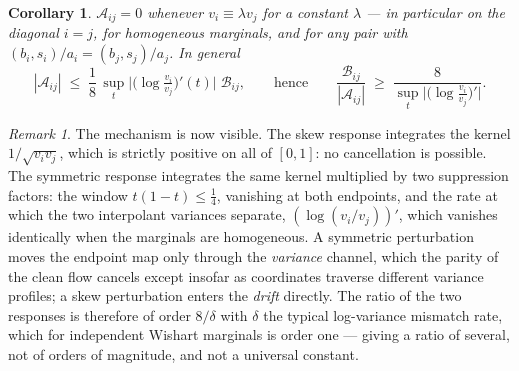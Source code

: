 \documentclass[11pt]{article}
\newtheorem{corollary}{Corollary}
\theoremstyle{remark}
\newtheorem{remark}{Remark}
\begin{document}
\begin{corollary}\label{cor:supp}
$\mathcal A_{ij}=0$ whenever $v_i\equiv\lambda v_j$ for a constant $\lambda$ --- in particular on
the diagonal $i=j$, for homogeneous marginals, and for any pair with
$(b_i,s_i)/a_i=(b_j,s_j)/a_j$. In general
\[
|\mathcal A_{ij}|\;\le\;\frac18\,\sup_{t}\big|\big(\log\tfrac{v_i}{v_j}\big)'(t)\big|\;
\mathcal B_{ij},
\qquad\text{hence}\qquad
\frac{\mathcal B_{ij}}{|\mathcal A_{ij}|}\;\ge\;
\frac{8}{\sup_t\big|\big(\log\tfrac{v_i}{v_j}\big)'\big|}.
\]
\end{corollary}

\begin{remark}\label{rem:mech}
The mechanism is now visible. The skew response integrates the kernel $1/\sqrt{v_iv_j}$, which is
strictly positive on all of $[0,1]$: no cancellation is possible. The symmetric response
integrates the same kernel multiplied by two suppression factors: the window $t(1-t)\le\tfrac14$,
vanishing at both endpoints, and the rate at which the two interpolant variances separate,
$(\log(v_i/v_j))'$, which vanishes identically when the marginals are homogeneous. A symmetric
perturbation moves the endpoint map only through the \emph{variance} channel, which the parity of
the clean flow cancels except insofar as coordinates traverse different variance profiles; a skew
perturbation enters the \emph{drift} directly. The ratio of the two responses is therefore of
order $8/\delta$ with $\delta$ the typical log-variance mismatch rate, which for independent
Wishart marginals is order one --- giving a ratio of several, not of orders of magnitude, and not
a universal constant.
\end{remark}
\end{document}

